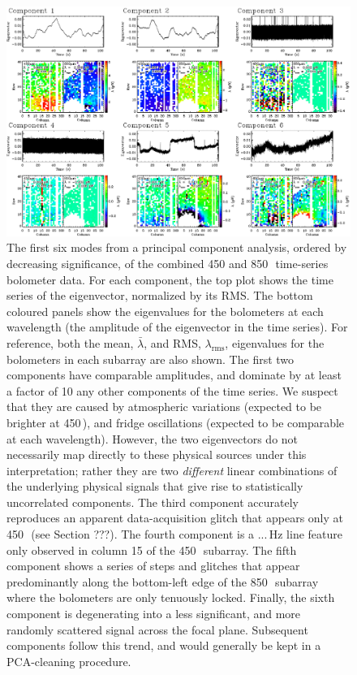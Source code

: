 \documentclass[useAMS,usenatbib,nofootinbib]{mn2e}
\newcommand{\rms}{RMS}
\begin{document}
\begin{figure}
\centering
\includegraphics[width=\linewidth]{pca.pdf}
\caption{The first six modes from a principal component analysis,
  ordered by decreasing significance, of the combined 450 and
  850\,\micron\ time-series bolometer data. For each component, the
  top plot shows the time series of the eigenvector, normalized by its
  \rms. The bottom coloured panels show the eigenvalues for the
  bolometers at each wavelength (the amplitude of the eigenvector in
  the time series). For reference, both the mean, $\bar{\lambda}$, and
  \rms, $\lambda_\mathrm{rms}$, eigenvalues for the bolometers in each
  subarray are also shown. The first two components have comparable
  amplitudes, and dominate by at least a factor of 10 any other
  components of the time series. We suspect that they are caused by
  atmospheric variations (expected to be brighter at 450\,\micron),
  and fridge oscillations (expected to be comparable at each
  wavelength). However, the two eigenvectors do not necessarily map
  directly to these physical sources under this interpretation; rather
  they are two \emph{different} linear combinations of the underlying
  physical signals that give rise to statistically uncorrelated
  components. The third component accurately reproduces an apparent
  data-acquisition glitch that appears only at 450\,\micron\ (see
  Section ???). The fourth component is a ...\,Hz line feature only
  observed in column 15 of the 450\,\micron\ subarray. The fifth
  component shows a series of steps and glitches that appear
  predominantly along the bottom-left edge of the 850\,\micron\
  subarray where the bolometers are only tenuously locked. Finally,
  the sixth component is degenerating into a less significant, and
  more randomly scattered signal across the focal plane. Subsequent
  components follow this trend, and would generally be kept in a
  PCA-cleaning procedure.}
\label{fig:pca}
\end{figure}
\end{document}
